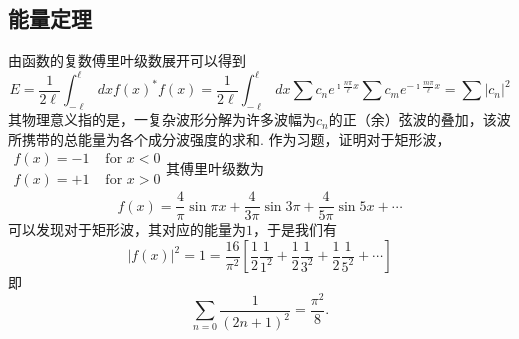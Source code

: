 \subsection{能量定理}
由函数的复数傅里叶级数展开可以得到
\begin{equation}
  E = \frac{1}{2\ell} \int_{-\ell}^{\ell} dx f(x)^* f(x) 
 = \frac{1}{2\ell} \int_{-\ell}^{\ell} dx  \sum c_n e^{\imath \frac{n\pi}{\ell} x} \sum c_m e^{-\imath \frac{m\pi}{\ell} x}
 = \sum |c_n|^2
\end{equation}
其物理意义指的是，一复杂波形分解为许多波幅为$c_n$的正（余）弦波的叠加，该波所携带的总能量为各个成分波强度的求和.
作为习题，证明对于矩形波，
$\begin{array}{ll}f(x)=-1 & \text { for } x<0 \\ f(x)=+1 & \text { for } x>0\end{array}$其傅里叶级数为
$$
f(x)=\frac{4}{\pi} \sin \pi x+\frac{4}{3 \pi} \sin 3 \pi+\frac{4}{5 \pi} \sin 5 x+\cdots
$$
可以发现对于矩形波，其对应的能量为$1$，于是我们有
$$
|f(x)|^2=1=\frac{16}{\pi^2}\left[\frac{1}{2} \frac{1}{1^2}+\frac{1}{2} \frac{1}{3^2}+\frac{1}{2} \frac{1}{5^2}+\cdots\right]
$$
即
\[
\sum_{n=0} \frac{1}{(2n+1)^2} = \frac{\pi^2}{8} .
\]